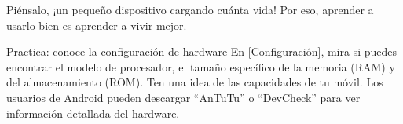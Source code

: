 Piénsalo, ¡un pequeño dispositivo cargando cuánta vida! Por eso, aprender a usarlo bien es aprender a vivir mejor.

\begin{tcbpractice}{Practica: conoce la configuración de hardware}
En [Configuración], mira si puedes encontrar el modelo de procesador, el tamaño específico de la memoria (RAM) y del almacenamiento (ROM). Ten una idea de las capacidades de tu móvil. Los usuarios de Android pueden descargar “AnTuTu” o “DevCheck” para ver información detallada del hardware.

\end{tcbpractice}
